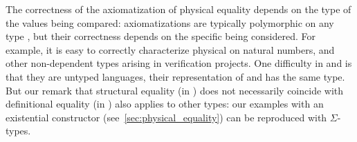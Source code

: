 The correctness of the axiomatization of physical equality depends on the type of the values being compared: axiomatizations are typically polymorphic on any type , but their correctness depends on the specific  being considered.
%
For example, it is easy to correctly characterize physical on natural numbers, and other non-dependent types arising in \Rocq verification projects.
%
One difficulty in \HeapLang and \ZooLang is that they are untyped languages, their representation of  and  has the same type.
%
But our remark that structural equality (in \OCaml) does not necessarily coincide with definitional equality (in \Rocq) also applies to other \Rocq types: our examples with an existential  constructor (see~\cref{sec:physical_equality}) can be reproduced with $\Sigma$-types.

